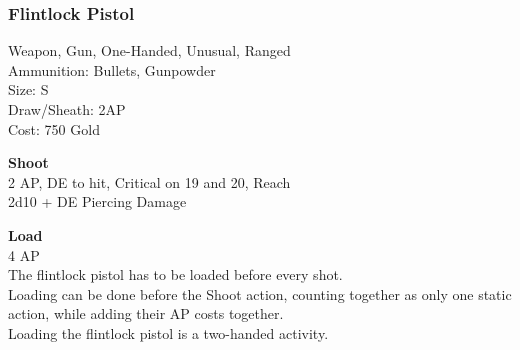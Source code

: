 \subsubsection{Flintlock Pistol}\label{weapon:flintlockPistol}
Weapon, Gun, One-Handed, Unusual, Ranged\\
Ammunition: Bullets, Gunpowder\\
Size: S\\
Draw/Sheath: 2AP\\
Cost: 750 Gold

\textbf{Shoot} \\
2 AP, DE to hit, Critical on 19 and 20,  Reach\\
2d10 + DE Piercing Damage

\textbf{Load} \\
4 AP\\
The flintlock pistol has to be loaded before every shot.\\
Loading can be done before the Shoot action, counting together as only one static action, while adding their AP costs together.\\
Loading the flintlock pistol is a two-handed activity.
